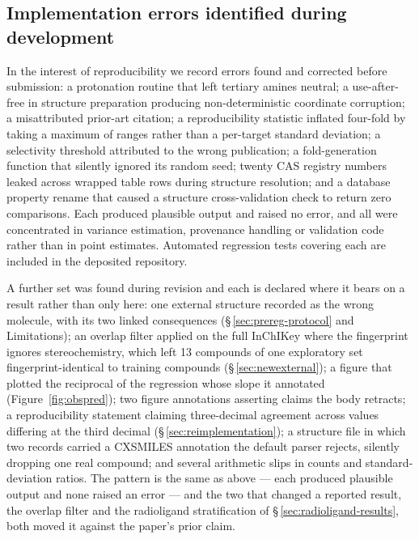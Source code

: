 \documentclass[11pt,a4paper]{article}
\begin{document}
\subsection*{Implementation errors identified during development}
In the interest of reproducibility we record errors found and corrected before
submission: a protonation routine that left tertiary amines neutral; a use-after-free
in structure preparation producing non-deterministic coordinate corruption; a
misattributed prior-art citation; a reproducibility statistic inflated four-fold by
taking a maximum of ranges rather than a per-target standard deviation; a selectivity
threshold attributed to the wrong publication; a fold-generation function that
silently ignored its random seed; twenty CAS registry numbers leaked across wrapped
table rows during structure resolution; and a database property rename that caused a
structure cross-validation check to return zero comparisons. Each produced plausible
output and raised no error, and all were concentrated in variance estimation,
provenance handling or validation code rather than in point estimates. Automated
regression tests covering each are included in the deposited repository.

A further set was found during revision and each is declared where it bears on a result
rather than only here: one external structure recorded as the wrong molecule, with its two
linked consequences (\S\,\ref{sec:prereg-protocol} and Limitations); an overlap filter
applied on the full InChIKey where the fingerprint ignores stereochemistry, which left 13
compounds of one exploratory set fingerprint-identical to training compounds
(\S\,\ref{sec:newexternal}); a figure that plotted the reciprocal of the regression
whose slope it annotated (Figure~\ref{fig:obspred}); two figure annotations asserting
claims the body retracts; a reproducibility statement claiming three-decimal agreement
across values differing at the third decimal (\S\,\ref{sec:reimplementation}); a structure
file in which two records carried a CXSMILES annotation the default parser rejects,
silently dropping one real compound; and several arithmetic slips in counts and
standard-deviation ratios. The pattern is the same as above --- each produced plausible
output and none raised an error --- and the two that changed a reported result, the
overlap filter and the radioligand stratification of \S\,\ref{sec:radioligand-results},
both moved it against the paper's prior claim.


\end{document}
